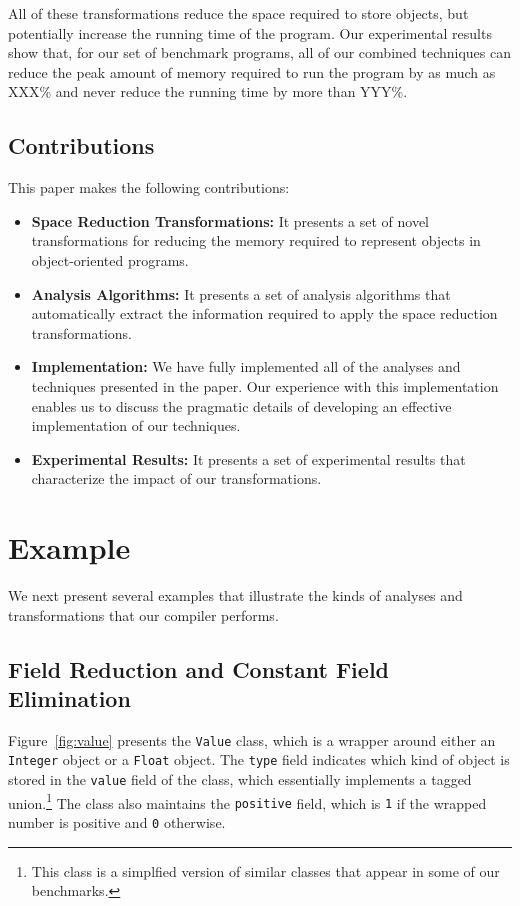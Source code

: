 \documentclass{acmconf}
\begin{document}
All of these transformations reduce the space required to store
objects, but potentially increase the running time of the program.
Our experimental results show that, for our set of benchmark
programs, all of our combined techniques can reduce the peak amount of memory
required to run the program by as much as XXX\% and never reduce the
running time by more than YYY\%.

\subsection{Contributions}

This paper makes the following contributions:
\begin{itemize}
\item {\bf Space Reduction Transformations:} It presents a set
of novel transformations for reducing the memory required to 
represent objects in object-oriented programs.

\item {\bf Analysis Algorithms:} It presents a set of 
analysis algorithms that automatically extract the 
information required to apply the space reduction 
transformations.

\item {\bf Implementation:} We have fully 
implemented all of the analyses and techniques 
presented in the paper. Our experience with this
implementation enables us to discuss the pragmatic
details of developing an effective implementation 
of our techniques. 

\item {\bf Experimental Results:} It presents a set
of experimental results that characterize the impact
of our transformations. 
\end{itemize}

\section{Example}

We next present several examples that illustrate the kinds of 
analyses and transformations that our compiler performs.

\subsection{Field Reduction and Constant Field Elimination}

Figure~\ref{fig:value} presents the {\tt Value} class, which is 
a wrapper around either an {\tt Integer} object or a {\tt Float}
object. The {\tt type} field indicates which kind of object
is stored in the {\tt value} field of the class, 
which essentially implements a tagged 
union.\footnote{This class is a simplfied version of similar
classes that appear in some of our benchmarks.} 
The class also maintains the {\tt positive} field, which is
{\tt 1} if the wrapped number is positive and {\tt 0} otherwise. 
\end{document}
